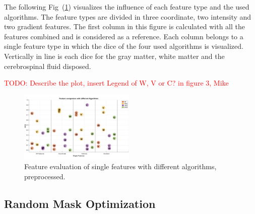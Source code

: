 \documentclass[journal]{IEEEtran}
\newcommand\TODO[1]{\textcolor{red}{TODO: #1}}
\begin{document}
The following Fig~(\ref{FeatEval}) visualizes the influence of each feature type and the used algorithms. The feature types are divided in three coordinate, two intensity and two gradient features. The first column in this figure is calculated with all the features combined and is considered as a reference. Each column belongs to a single feature type in which the dice of the four used algorithms is visualized. Vertically in line is each dice for the gray matter, white matter and the cerebrospinal fluid disposed.

\TODO{Describe the plot, insert Legend of W, V or C? in figure 3, Mike}
\begin{figure}[h]
	\centering
	\includegraphics[width=0.49\textwidth]{images/FeatureEvaluation}
	\caption{Feature evaluation of single features with different algorithms, preprocessed.}
	\label{FeatEval}
\end{figure}





\subsection{Random Mask Optimization}
\end{document}
